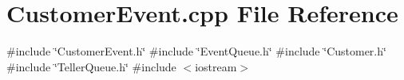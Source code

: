 \section{Customer\+Event.\+cpp File Reference}
\label{CustomerEvent_8cpp}
{\ttfamily \#include \char`\"{}Customer\+Event.\+h\char`\"{}}\newline
{\ttfamily \#include \char`\"{}Event\+Queue.\+h\char`\"{}}\newline
{\ttfamily \#include \char`\"{}Customer.\+h\char`\"{}}\newline
{\ttfamily \#include \char`\"{}Teller\+Queue.\+h\char`\"{}}\newline
{\ttfamily \#include $<$iostream$>$}\newline

